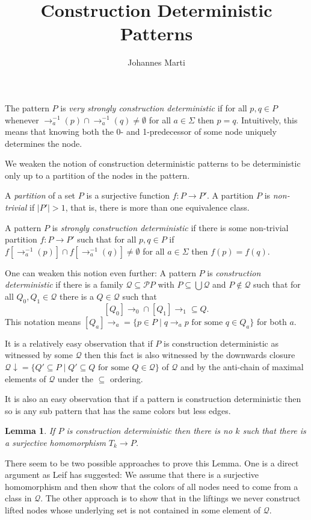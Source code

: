 \documentclass[a4paper]{article}
\title{Construction Deterministic Patterns}
\author{Johannes Marti}
\newcommand{\prearrow}[1]{{\rightarrow_{#1}^{-1}}}
\newcommand{\powerset}{\mathcal{P}}
\newcommand{\Q}{\mathcal{Q}}
\newtheorem{lemma}[theorem]{Lemma}
\begin{document}
\maketitle

\noindent The pattern $P$ is \emph{very strongly construction
deterministic} if for all $p,q \in P$ whenever $\prearrow{a}(p) \cap
\prearrow{a}(q) \neq \emptyset$ for all $a \in \Sigma$ then $p = q$.
Intuitively, this means that knowing both the 0- and 1-predecessor of
some node uniquely determines the node.

We weaken the notion of construction deterministic patterns to be
deterministic only up to a partition of the nodes in the pattern.

A \emph{partition} of a set $P$ is a surjective function $f : P \to P'$.
A partition $P$ is \emph{non-trivial} if $|P'| > 1$, that is, there is
more than one equivalence class.

A pattern $P$ is \emph{strongly construction deterministic} if there is
some non-trivial partition $f : P \to P'$ such that for all $p,q \in P$
if $f[\prearrow{a}(p)] \cap f[\prearrow{a}(q)] \neq
\emptyset$ for all $a \in \Sigma$ then $f(p) = f(q)$.

One can weaken this notion even further: A pattern $P$ is
\emph{construction deterministic} if there is a family $\Q \subseteq
\powerset P$ with $P \subseteq \bigcup \Q$ and $P \notin \Q$ such that
for all $Q_0, Q_1 \in \Q$ there is a $Q \in \Q$ such that
\[
 [Q_0]{\rightarrow_0} \cap [Q_1]{\rightarrow_1} \subseteq Q.
\]
This notation means $[Q_a]{\rightarrow_a} = \{p \in P \mid q \rightarrow_a
p \mbox{ for some } q \in Q_a\}$ for both $a$.

It is a relatively easy observation that if $P$ is construction
deterministic as witnessed by some $\Q$ then this fact is also witnessed
by the downwards closure ${\Q\!\downarrow} = \{Q' \subseteq P \mid Q'
\subseteq Q \mbox{ for some } Q \in \Q\}$ of $\Q$ and by the anti-chain
of maximal elements of $\Q$ under the $\subseteq$ ordering.

It is also an easy observation that if a pattern is construction
deterministic then so is any sub pattern that has the same colors but
less edges.

\begin{lemma} \label{killer lemma}
 If $P$ is construction deterministic then there is no $k$ such
that there is a surjective homomorphism $T_k \to P$.
\end{lemma}
There seem to be two possible approaches to prove this Lemma. One is a
direct argument as Leif has suggested: We assume that there is a
surjective homomorphism and then show that the colors of all nodes need
to come from a class in $\Q$. The other approach is to show that in the
liftings we never construct lifted nodes whose underlying set is not
contained in some element of $\Q$.
\end{document}
